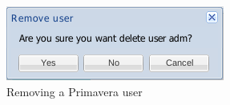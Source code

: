 \begin{figure}[H]
    \begin{center}
    \includegraphics[scale=0.6]{screenshots/primavera/primaverainterface_10.png}
    \caption{Removing a Primavera user}
    \label{fig:primavera_delete_user}
    \end{center}
\end{figure}

